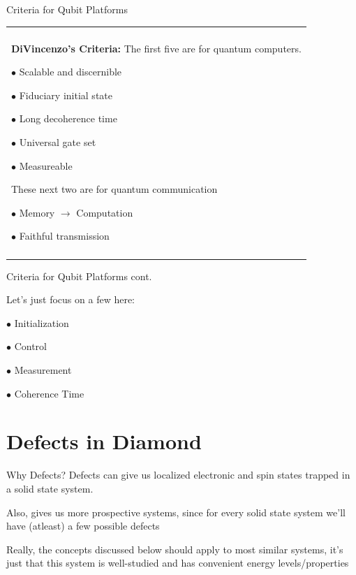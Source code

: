 \documentclass[11pt]{beamer}
\newenvironment{boxed2}
    {\begin{center}
    \begin{tabular}{|p{0.95\textwidth}|}
    \hline\\
    }
    { 
    \\\\\hline
    \end{tabular} 
    \end{center}
    }
\begin{document}
\begin{frame}{Criteria for Qubit Platforms}

\begin{boxed2}
\textbf{DiVincenzo's Criteria:} The first five are for quantum computers.

$\bullet$ Scalable and discernible

\medskip

$\bullet$ Fiduciary initial state

\medskip

$\bullet$ Long decoherence time

\medskip

$\bullet$ Universal gate set

\medskip

$\bullet$ Measureable

\medskip

These next two are for quantum communication

\medskip

$\bullet$ Memory $\rightarrow$ Computation

\medskip

$\bullet$ Faithful transmission


\end{boxed2}
\end{frame}

\begin{frame}{Criteria for Qubit Platforms cont.}

Let's just focus on a few here:\pause

\vspace{1cm}

$\bullet$ Initialization

\vspace{1cm}\pause

$\bullet$ Control

\vspace{1cm}\pause

$\bullet$ Measurement

\vspace{1cm}\pause

$\bullet$ Coherence Time

\end{frame}


\section{Defects in Diamond}
\begin{frame}{Why Defects?}
Defects can give us localized electronic and spin states trapped in a solid state system.

\vspace{.8cm}\pause

Also, gives us more prospective systems, since for every solid state system we'll have (atleast) a few possible defects

\vspace{.8cm}\pause

Really, the concepts discussed below should apply to most similar systems, it's just that this system is well-studied and has convenient energy levels/properties
\end{frame}
\end{document}
